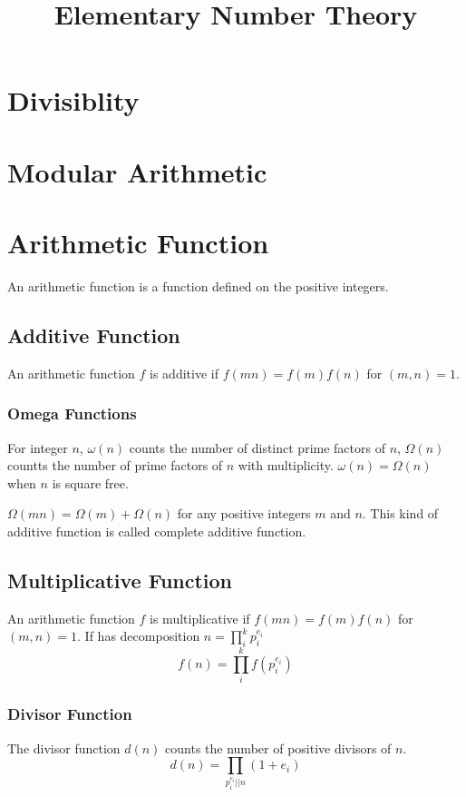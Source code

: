 \documentclass{article}
\title{Elementary Number Theory}
\begin{document}
\maketitle
\newpage
\tableofcontents
\newpage

\section{Divisiblity}

\section{Modular Arithmetic}

\section{Arithmetic Function}
An arithmetic function is a function defined on the positive integers.

\subsection{Additive Function}
An arithmetic function $f$ is additive if $f(mn) = f(m)f(n)$ for $(m, n) = 1$.

\subsubsection*{Omega Functions}
For integer $n$, $\omega(n)$ counts the number of distinct prime factors of $n$,
$\Omega(n)$ countts the number of prime factors of $n$ with multiplicity.
$\omega(n) = \Omega(n)$ when $n$ is square free.

$\Omega(mn) = \Omega(m) + \Omega(n)$ for any positive integers $m$ and $n$.
This kind of additive function is called complete additive function.


\subsection{Multiplicative Function}
An arithmetic function $f$ is multiplicative if $f(mn) = f(m)f(n)$ for $(m, n) = 1$.
If has decomposition $n = \prod_i^k p_i^{e_i}$
$$f(n) = \prod_i^k f(p_i^{e_i})$$

\subsubsection*{Divisor Function}
The divisor function $d(n)$ counts the number of positive divisors of $n$.
$$d(n) = \prod_{p_i^{e_i} \vert\vert n} (1 + e_i)$$
\end{document}
